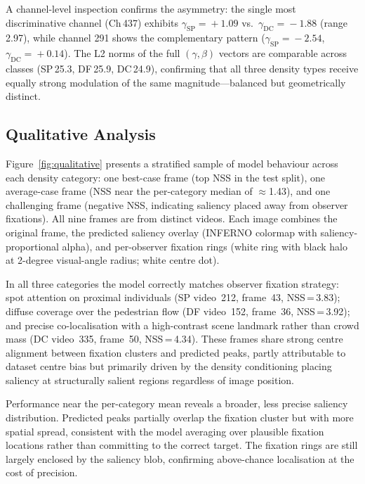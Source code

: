 \documentclass[twocolumn]{article}
\begin{document}
A channel-level inspection confirms the asymmetry: the single most
discriminative channel (Ch\,437) exhibits $\gamma_\mathrm{SP}\!=\!+1.09$
vs.\ $\gamma_\mathrm{DC}\!=\!-1.88$ (range\,2.97), while channel 291
shows the complementary pattern ($\gamma_\mathrm{SP}\!=\!-2.54$,
$\gamma_\mathrm{DC}\!=\!+0.14$).  The L2 norms of the full $(\gamma,\beta)$
vectors are comparable across classes (SP\,25.3, DF\,25.9, DC\,24.9),
confirming that all three density types receive equally strong modulation
of the same magnitude---balanced but geometrically distinct.

\subsection{Qualitative Analysis}

Figure~\ref{fig:qualitative} presents a stratified sample of model
behaviour across each density category: one best-case frame (top NSS
in the test split), one average-case frame (NSS near the per-category
median of $\approx$1.43), and one challenging frame (negative NSS,
indicating saliency placed away from observer fixations).  All nine
frames are from distinct videos.  Each image combines the original
frame, the predicted saliency overlay (INFERNO colormap with
saliency-proportional alpha), and per-observer fixation rings (white
ring with black halo at 2-degree visual-angle radius; white centre dot).

In all three categories the model correctly matches observer fixation
strategy: spot attention on proximal individuals (SP video~212,
frame~43, NSS\,=\,3.83); diffuse coverage over the pedestrian flow
(DF video~152, frame~36, NSS\,=\,3.92); and precise co-localisation
with a high-contrast scene landmark rather than crowd mass
(DC video~335, frame~50, NSS\,=\,4.34).  These frames share strong
centre alignment between fixation clusters and predicted peaks,
partly attributable to dataset centre bias but primarily driven by
the density conditioning placing saliency at structurally salient
regions regardless of image position.

Performance near the per-category mean reveals a broader, less
precise saliency distribution.  Predicted peaks partially overlap
the fixation cluster but with more spatial spread, consistent with
the model averaging over plausible fixation locations rather than
committing to the correct target.  The fixation rings are still
largely enclosed by the saliency blob, confirming above-chance
localisation at the cost of precision.
\end{document}

